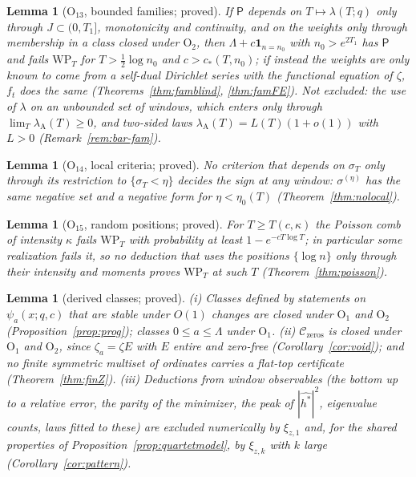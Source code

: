 \documentclass[11pt]{amsart}
\newtheorem{lemma}[theorem]{Lemma}
\theoremstyle{definition}
\theoremstyle{remark}
\newcommand{\lamA}{\lambda_{\mathrm A}(T)}
\newcommand{\sT}{\sigma_T}
\begin{document}
\begin{lemma}[$\mathrm O_{13}$, bounded families; proved]\label{lem:shape-fam}
If $\mathsf P$ depends on $T\mapsto\lambda(T;q)$ only through $J\subset(0,T_1]$, monotonicity and continuity, and on the weights only
through membership in a class closed under $\mathrm O_2$, then $\Lambda+c\mathbf 1_{n=n_0}$ with $n_0>e^{2T_1}$ has $\mathsf P$ and fails
$\mathrm{WP}_T$ for $T>\frac12\log n_0$ and $c>c_*(T,n_0)$; if instead the weights are only known to come from a self-dual Dirichlet
series with the functional equation of $\zeta$, $f_t$ does the same (Theorems~\ref{thm:famblind}, \ref{thm:famFE}). Not excluded: the use
of $\lambda$ on an unbounded set of windows, which enters only through $\lim_T\lamA\ge0$, and two-sided laws $\lamA=L(T)(1+o(1))$
with $L>0$ (Remark~\ref{rem:bar-fam}).
\end{lemma}

\begin{lemma}[$\mathrm O_{14}$, local criteria; proved]\label{lem:shape-local}
No criterion that depends on $\sT$ only through its restriction to $\{\sT<\eta\}$ decides the sign at any window: $\sigma^{(\eta)}$ has the
same negative set and a negative form for $\eta<\eta_0(T)$ (Theorem~\ref{thm:nolocal}).
\end{lemma}

\begin{lemma}[$\mathrm O_{15}$, random positions; proved]\label{lem:shape-poisson}
For $T\ge T(c,\kappa)$ the Poisson comb of intensity $\kappa$ fails $\mathrm{WP}_T$ with probability at least $1-e^{-cT\log T}$; in
particular some realization fails it, so no deduction that uses the positions $\{\log n\}$ only through their intensity and moments proves
$\mathrm{WP}_T$ at such $T$ (Theorem~\ref{thm:poisson}).
\end{lemma}

\begin{lemma}[derived classes; proved]\label{lem:shape-classes}
\emph{(i)} Classes defined by statements on $\psi_a(x;q,c)$ that are stable under $O(1)$ changes are closed under $\mathrm O_1$ and
$\mathrm O_2$ (Proposition~\ref{prop:prog}); classes $0\le a\le\Lambda$ under $\mathrm O_1$. \emph{(ii)} $\mathcal C_{\mathrm{zeros}}$ is
closed under $\mathrm O_1$ and $\mathrm O_2$, since $\zeta_a=\zeta E$ with $E$ entire and zero-free (Corollary~\ref{cor:void}); and no finite
symmetric multiset of ordinates carries a flat-top certificate (Theorem~\ref{thm:finZ}). \emph{(iii)} Deductions from window observables
(the bottom up to a relative error, the parity of the minimizer, the peak of $|\widehat{h^*}|^2$, eigenvalue counts, laws fitted to these)
are excluded numerically by $\xi_{z,1}$ and, for the shared properties of Proposition~\ref{prop:quartetmodel}, by $\xi_{z,k}$ with $k$ large
(Corollary~\ref{cor:pattern}).
\end{lemma}
\end{document}
